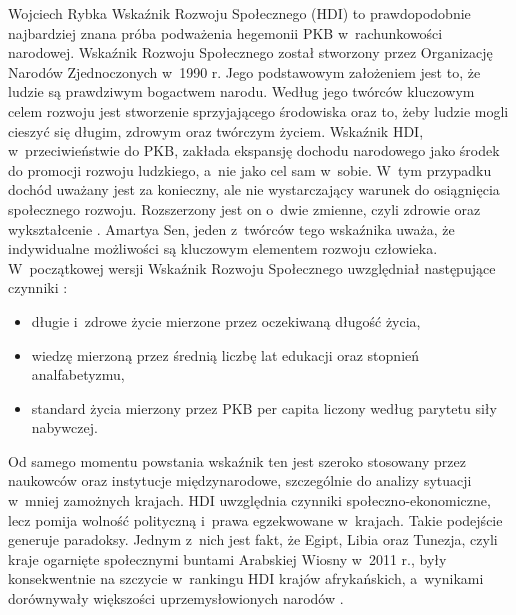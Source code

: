 \begin{artplenv}{Wojciech Rybka}
Wskaźnik Rozwoju Społecznego (HDI) to prawdopodobnie najbardziej znana próba podważenia hegemonii PKB w~rachunkowości
narodowej. Wskaźnik Rozwoju Społecznego został stworzony przez Organizację Narodów Zjednoczonych w~1990 r. Jego
podstawowym założeniem jest to, że ludzie są prawdziwym bogactwem narodu. Według jego twórców kluczowym celem rozwoju
jest stworzenie sprzyjającego środowiska oraz to, żeby ludzie mogli cieszyć się długim, zdrowym oraz twórczym życiem.
Wskaźnik HDI, w~przeciwieństwie do PKB, zakłada ekspansję dochodu narodowego jako środek do promocji rozwoju ludzkiego,
a~nie jako cel sam w~sobie. W~tym przypadku dochód uważany jest za konieczny, ale nie wystarczający warunek do
osiągnięcia społecznego rozwoju. Rozszerzony jest on o~dwie zmienne, czyli zdrowie oraz wykształcenie
\parencite{fioramonti_gross_2013}.
Amartya Sen, jeden z~twórców tego wskaźnika uważa, że indywidualne
możliwości są kluczowym elementem rozwoju człowieka. W~początkowej wersji Wskaźnik Rozwoju Społecznego uwzględniał
następujące czynniki
\parencite{united_nations_development_programme_human_2019}:

\begin{itemize}
\item długie i~zdrowe życie mierzone przez oczekiwaną długość życia,
\item wiedzę mierzoną przez średnią liczbę lat edukacji oraz stopnień analfabetyzmu,
\item standard życia mierzony przez PKB per capita liczony według parytetu siły nabywczej.
\end{itemize}

Od samego momentu powstania wskaźnik ten jest szeroko stosowany przez naukowców oraz instytucje międzynarodowe,
szczególnie do analizy sytuacji w~mniej zamożnych krajach. HDI uwzględnia czynniki społeczno-ekonomiczne, lecz pomija
wolność polityczną i~prawa egzekwowane w~krajach. Takie podejście generuje paradoksy. Jednym z~nich jest fakt, że
Egipt, Libia oraz Tunezja, czyli kraje ogarnięte społecznymi buntami Arabskiej Wiosny w~2011 r., były konsekwentnie na
szczycie w~rankingu HDI krajów afrykańskich, a~wynikami dorównywały większości uprzemysłowionych narodów
\parencite{fioramonti_gross_2013}.


\end{artplenv}
